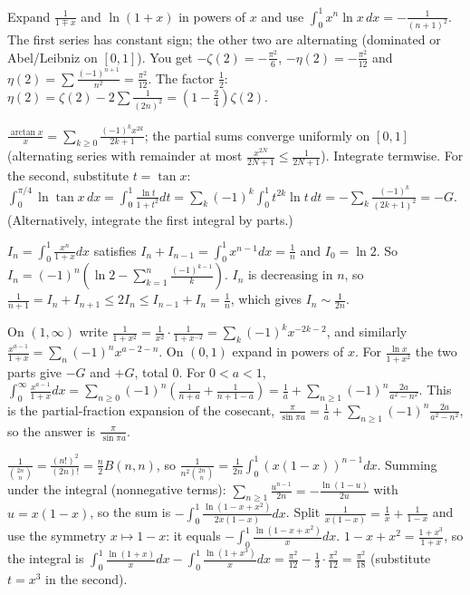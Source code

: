 \documentclass[11pt,a4paper]{article}
\begin{document}

Expand \(\frac1{1\mp x}\) and \(\ln(1+x)\) in powers of \(x\) and use \(\int_0^1x^n\ln x\,dx=-\frac1{(n+1)^2}\). The first series has constant sign; the other two are alternating (dominated or Abel/Leibniz on \([0,1]\)).
You get \(-\zeta(2)=-\frac{\pi^2}6\), \(-\eta(2)=-\frac{\pi^2}{12}\) and \(\eta(2)=\sum\frac{(-1)^{n+1}}{n^2}=\frac{\pi^2}{12}\). The factor \(\frac12\): \(\eta(2)=\zeta(2)-2\sum\frac1{(2n)^2}=\left(1-\frac24\right)\zeta(2)\).

\(\frac{\arctan x}x=\sum_{k\ge0}\frac{(-1)^kx^{2k}}{2k+1}\); the partial sums converge uniformly on \([0,1]\) (alternating series with remainder at most \(\frac{x^{2N}}{2N+1}\le\frac1{2N+1}\)). Integrate termwise.
For the second, substitute \(t=\tan x\): \(\int_0^{\pi/4}\ln\tan x\,dx=\int_0^1\frac{\ln t}{1+t^2}dt=\sum_k(-1)^k\int_0^1t^{2k}\ln t\,dt=-\sum_k\frac{(-1)^k}{(2k+1)^2}=-G\). (Alternatively, integrate the first integral by parts.)

\(I_n=\int_0^1\frac{x^n}{1+x}dx\) satisfies \(I_n+I_{n-1}=\int_0^1x^{n-1}dx=\frac1n\) and \(I_0=\ln2\). So \(I_n=(-1)^n\left(\ln2-\sum_{k=1}^n\frac{(-1)^{k-1}}k\right)\).
\(I_n\) is decreasing in \(n\), so \(\frac1{n+1}=I_n+I_{n+1}\le2I_n\le I_{n-1}+I_n=\frac1n\), which gives \(I_n\sim\frac1{2n}\).

On \((1,\infty)\) write \(\frac1{1+x^2}=\frac{1}{x^2}\cdot\frac1{1+x^{-2}}=\sum_k(-1)^kx^{-2k-2}\), and similarly \(\frac{x^{a-1}}{1+x}=\sum_n(-1)^nx^{a-2-n}\). On \((0,1)\) expand in powers of \(x\).
For \(\frac{\ln x}{1+x^2}\) the two parts give \(-G\) and \(+G\), total \(0\). For \(0\lt a\lt1\), \(\int_0^\infty\frac{x^{a-1}}{1+x}dx=\sum_{n\ge0}(-1)^n\left(\frac1{n+a}+\frac1{n+1-a}\right)=\frac1a+\sum_{n\ge1}(-1)^n\frac{2a}{a^2-n^2}\).
This is the partial-fraction expansion of the cosecant, \(\frac\pi{\sin\pi a}=\frac1a+\sum_{n\ge1}(-1)^n\frac{2a}{a^2-n^2}\), so the answer is \(\frac{\pi}{\sin\pi a}\).

\(\frac1{\binom{2n}n}=\frac{(n!)^2}{(2n)!}=\frac n2B(n,n)\), so \(\frac1{n^2\binom{2n}n}=\frac1{2n}\int_0^1\left(x(1-x)\right)^{n-1}dx\).
Summing under the integral (nonnegative terms): \(\sum_{n\ge1}\frac{u^{n-1}}{2n}=-\frac{\ln(1-u)}{2u}\) with \(u=x(1-x)\), so the sum is \(-\int_0^1\frac{\ln(1-x+x^2)}{2x(1-x)}dx\). Split \(\frac1{x(1-x)}=\frac1x+\frac1{1-x}\) and use the symmetry \(x\mapsto1-x\): it equals \(-\int_0^1\frac{\ln(1-x+x^2)}xdx\).
\(1-x+x^2=\frac{1+x^3}{1+x}\), so the integral is \(\int_0^1\frac{\ln(1+x)}xdx-\int_0^1\frac{\ln(1+x^3)}xdx=\frac{\pi^2}{12}-\frac13\cdot\frac{\pi^2}{12}=\frac{\pi^2}{18}\) (substitute \(t=x^3\) in the second).
\end{document}
